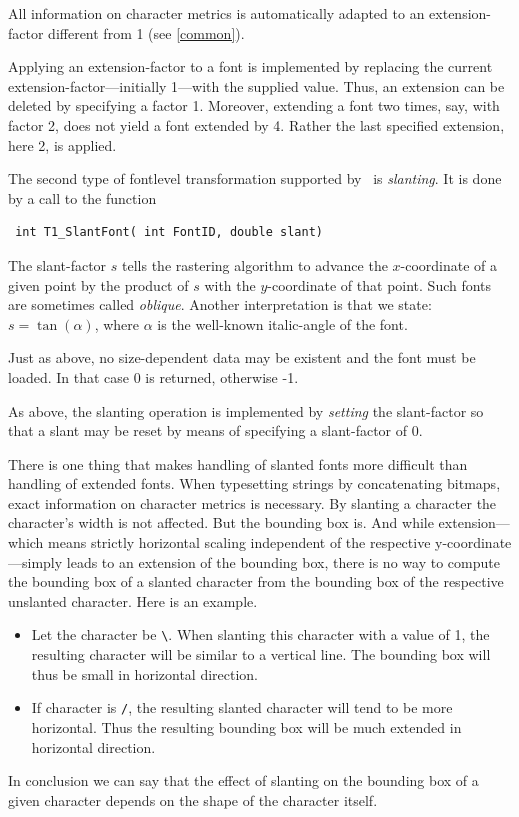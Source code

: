 All information on character metrics is automatically adapted to an
extension-factor different from 1 (see \ref{common}).

Applying an extension-factor to a font is implemented by replacing the current
extension-factor---initially 1---with the supplied value. Thus, an extension
can be deleted by specifying a factor 1. Moreover, extending a font two
times, say, with factor 2, does not yield a font extended by 4. Rather the
last specified extension, here 2, is applied.

The second type of fontlevel transformation supported by \tonelib\ is {\em
  slanting}.  It is done by a call to the function \precorr
\begin{verbatim}
 int T1_SlantFont( int FontID, double slant)
\end{verbatim}\postcorr
The slant-factor $s$ tells the rastering algorithm to advance the $x$-coordinate
of a given point by the product of $s$ with the $y$-coordinate of that
point. Such fonts are sometimes called {\em oblique}. Another interpretation
is that we state: $s=\tan(\alpha)$, where $\alpha$ is the well-known
italic-angle of the font. 

Just as above, no size-dependent data may be existent and the font must be
loaded. In that case 0 is returned, otherwise -1.

As above, the slanting operation is implemented by {\em setting} the
slant-factor so that a slant may be reset by means of specifying a
slant-factor of 0.

There is one thing that makes handling of slanted fonts more difficult than
handling of extended fonts. When
typesetting strings by concatenating bitmaps, exact information on character
metrics is necessary. By slanting a character the character's width is not
affected. But the bounding box is. And while extension---which means 
strictly horizontal scaling independent of the respective
y-coordinate---simply leads to an extension of the bounding box, there is no
way to compute the
bounding box of a slanted character from the bounding box of the respective
unslanted character. Here is an example.
\begin{itemize}
\item Let the character be \verb+\+. When slanting this character with a
  value of 1, the resulting character will be similar to a vertical line. The
  bounding box will thus be small in horizontal direction.
\item If character is \verb+/+, the resulting slanted
  character will tend to be more horizontal. Thus the resulting bounding box
  will be much extended in horizontal direction.
\end{itemize}
In conclusion
we can say that the effect of slanting on the bounding box of
a given character depends on the shape of the character itself. 

